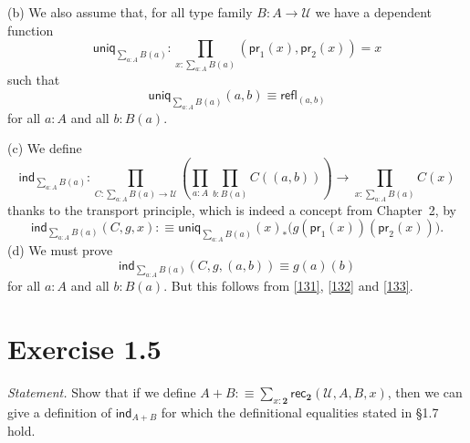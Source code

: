 \documentclass[12pt]{article}
\newcommand{\ind}{\mathsf{ind}}
\newcommand{\nn}{\noindent}
\newcommand{\pr}{\mathsf{pr}}
\newcommand{\rec}{\mathsf{rec}}
\newcommand{\refl}{\mathsf{refl}}
\newcommand{\two}{\mathbf2}
\newcommand{\U}{\mathcal U}
\newcommand{\uniq}{\mathsf{uniq}}
\begin{document}
\nn(b) We also assume that, for all type family $B:A\to\U$ we have a dependent function 
$$
\uniq_{\sum_{a:A}B(a)}:\prod_{x:\sum_{a:A}B(a)}(\pr_1(x),\pr_2(x))=x
$$ 
such that 
\begin{equation}\label{132}
\uniq_{\sum_{a:A}B(a)}(a,b)\equiv\refl_{(a,b)}
\end{equation}
for all $a:A$ and all $b:B(a)$. 

\nn(c) We define
$$
\ind_{\sum_{a:A}B(a)} : \prod_{C:\sum_{a:A}B(a)\to\U} 
\left(\prod_{a:A}\prod_{b:B(a)} C((a,b))\right) 
\to \prod_{x:\sum_{a:A}B(a)} C(x)
$$
thanks to the transport principle, which is indeed a concept from Chapter~2, by
\begin{equation}\label{133}
\ind_{\sum_{a:A}B(a)}(C,g,x):
\equiv\uniq_{\sum_{a:A}B(a)}(x)_*\Big(g(\pr_1(x))(\pr_2(x))\Big).
\end{equation}
(d) We must prove 
$$
\ind_{\sum_{a:A}B(a)}(C,g,(a,b))\equiv g(a)(b)
$$
for all $a:A$ and all $b:B(a)$. But this follows from \eqref{131}, \eqref{132} and \eqref{133}.


\section{Exercise 1.5}

\emph{Statement.} Show that if we define $A+B:\equiv\sum_{x:\two}\rec_\two(\U,A,B,x)$, then we can give a definition of $\ind_{A+B}$ for which the definitional equalities stated in \S1.7 hold.
\end{document}
